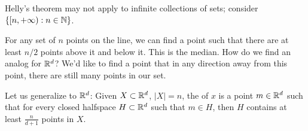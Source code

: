 \begin{remark}
Helly's theorem may not apply to infinite collections of sets; consider $\{[n,+\infty):n\in \mathbb{N}\}$.
\end{remark}

For any set of $n$ points on the line, we can find a point such that there are at least $n/2$ points above it and below it. This is the median. How do we find an analog for $\mathbb{R}^d$? We'd like to find a point that in any direction away from this point, there are still many points in our set.


Let us generalize to $\mathbb{R}^d$: Given $X\subset \mathbb{R}^d$, $|X|=n$, the  of $x$ is a point $m\in \mathbb{R}^d$ such that for every closed halfspace $H\subset \mathbb{R}^d$ such that $m\in H$, then $H$ contains at least $\frac{n}{d+1}$ points in $X$.

